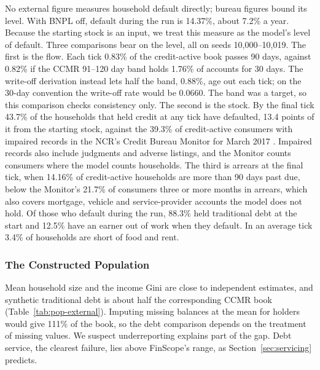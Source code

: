 No external figure measures household default directly; bureau figures bound its level. With \ac{BNPL} off, default during the run is 14.37\%, about 7.2\% a year. Because
the starting stock is an input, we treat this measure as the model's level of default. Three
comparisons bear on the level, all on seeds 10{,}000--10{,}019.
The first is the flow. Each tick 0.83\% of the credit-active book passes 90 days, against 0.82\%
if the \ac{CCMR} 91--120 day band holds 1.76\% of accounts for 30 days. The write-off derivation
instead lets half the band, 0.88\%, age out each tick; on the 30-day convention the write-off rate
would be 0.0660. The band was a target, so this comparison checks consistency only.
The second is the stock. By the final tick 43.7\% of the households that held credit at any tick
have defaulted, 13.4 points of it from the starting stock, against the 39.3\% of credit-active
consumers with impaired records in the \ac{NCR}'s Credit Bureau Monitor for March 2017
\citep{ncr_cbm_2017}. Impaired records also include judgments and adverse listings, and the
Monitor counts consumers where the model counts households.
The third is arrears at the final tick, when 14.16\% of credit-active households are more than
90 days past due, below the Monitor's 21.7\% of consumers three or more months in arrears, which
also covers mortgage, vehicle and service-provider accounts the model does not hold.
Of those who default during the run, 88.3\% held traditional debt at the start and 12.5\%
have an earner out of work when they default. In an average tick 3.4\% of households are short
of food and rent.

\subsubsection*{The Constructed Population}

Mean household size and the income Gini are close to independent estimates, and synthetic
traditional debt is about half the corresponding \ac{CCMR} book
(Table~\ref{tab:pop-external}). Imputing missing balances at the mean for holders would give
111\% of the book, so the debt comparison depends on the treatment of missing values. We suspect
underreporting explains part of the gap. Debt service, the clearest failure, lies above
\ac{FinScope}'s range, as Section~\ref{sec:servicing} predicts.


